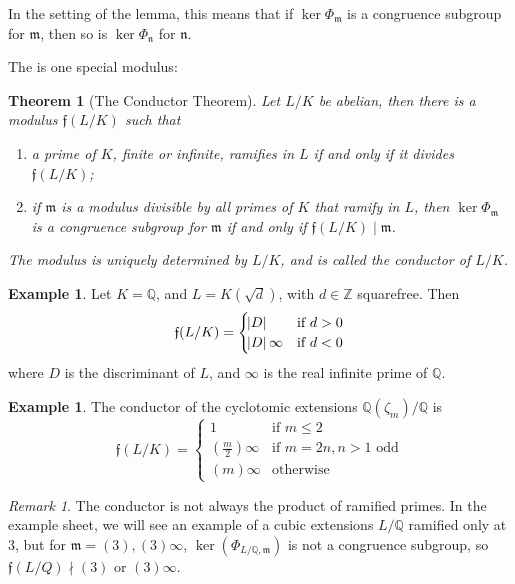 \documentclass[11pt]{article}
\theoremstyle{definition}
\newtheorem{example}[definition]{Example}
\theoremstyle{plain}
\newtheorem{theorem}[definition]{Theorem}
\theoremstyle{remark}
\newtheorem{remark}[definition]{Remark}
\newcommand{\ZZ}{\mathbb{Z}}
\newcommand{\QQ}{\mathbb{Q}}
\newcommand{\ff}{\mathfrak{f}}
\newcommand{\fm}{\mathfrak{m}}
\newcommand{\fn}{\mathfrak{n}}
\begin{document}
\noindent In the setting of the lemma, this means that if $\ker \Phi_\fm$ is a congruence subgroup for $\fm$, then so is $\ker \Phi_\fn$ for $\fn$.

The is one special modulus:

\begin{theorem}[The Conductor Theorem]\label{thm:3_2}
    Let $L/K$ be abelian, then there is a modulus $\ff(L/K)$ such that
    \begin{enumerate}
        \item a prime of $K$, finite or infinite, ramifies in $L$ if and only if it divides $\ff(L/K)$;
        \item if $\fm$ is a modulus divisible by all primes of $K$ that ramify in $L$, then $\ker \Phi_\fm$ is a congruence subgroup for $\fm$ if and only if $\ff(L/K) \mid \fm$.
    \end{enumerate}
    The modulus is uniquely determined by $L/K$, and is called the \emph{conductor} of $L/K$.
\end{theorem}

\begin{example}\label{eg:3_3}
    Let $K = \QQ$, and $L = K(\sqrt{d})$, with $d \in \ZZ$ squarefree. Then
    \begin{equation*}
        \ff(L/K) =
        \begin{cases}
            \abs{D} & \text{if } d>0\\
            \abs{D}\infty & \text{if } d<0
        \end{cases}
    \end{equation*}
    where $D$ is the discriminant of $L$, and $\infty$ is the real infinite prime of $\QQ$.
\end{example}

\begin{example}\label{eg:3_4}
    The conductor of the cyclotomic extensions $\QQ(\zeta_m)/\QQ$ is
    \begin{equation*}
        \ff(L/K) =
        \begin{cases}
            1 & \text{if } m \le 2\\
            (\frac{m}{2}) \infty &\text{if } m = 2n, n>1 \text{ odd}\\
            (m) \infty &\text{otherwise}
        \end{cases}
    \end{equation*}
\end{example}

\begin{remark}\label{rem:3_5}
    The conductor is not always the product of ramified primes. In the example sheet, we will see an example of a cubic extensions $L/\QQ$ ramified only at $3$, but for $\fm = (3), (3)\infty$, $\ker(\Phi_{L/\QQ, \fm})$ is not a congruence subgroup, so $\ff(L/Q) \nmid (3)$ or $(3) \infty$.
\end{remark}
\end{document}

